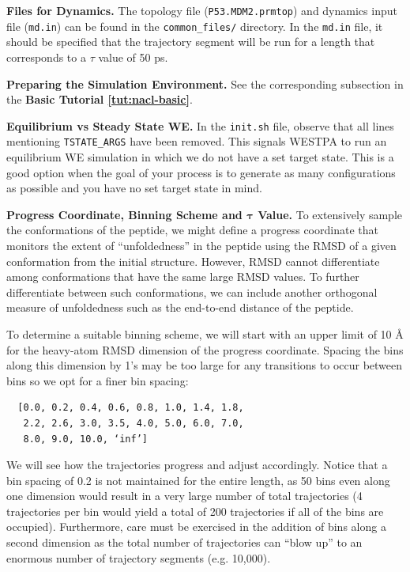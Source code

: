 \textbf{Files for Dynamics.} The topology file (\verb|P53.MDM2.prmtop|) and dynamics input file (\verb|md.in|) can be found in the \verb|common_files/| directory. 
In the \verb|md.in| file, it should be specified that the trajectory segment will be run for a length that corresponds to a $\tau$ value of 50 ps.

\textbf{Preparing the Simulation Environment.} See the corresponding subsection in the \textbf{Basic Tutorial \ref{tut:nacl-basic}}.

\textbf{Equilibrium vs Steady State WE.} In the \verb|init.sh| file, observe that all lines mentioning \verb|TSTATE_ARGS| have been removed. 
This signals WESTPA to run an equilibrium WE simulation in which we do not have a set target state. 
This is a good option when the goal of your process is to generate as many configurations as possible and you have no set target state in mind.

\textbf{Progress Coordinate, Binning Scheme and $\pmb{\tau}$ Value.} To extensively sample the conformations of the peptide, we might define a progress coordinate that monitors the extent of “unfoldedness” in the peptide using the RMSD of a given conformation from the initial structure. 
However, RMSD cannot differentiate among conformations that have the same large RMSD values. 
To further differentiate between such conformations, we can include another orthogonal measure of unfoldedness such as the end-to-end distance of the peptide. 

To determine a suitable binning scheme, we will start with an upper limit of 10 \AA{} for the heavy-atom RMSD dimension of the progress coordinate. 
Spacing the bins along this dimension by 1’s may be too large for any transitions to occur between bins so we opt for a finer bin spacing:
\begin{verbatim}
  [0.0, 0.2, 0.4, 0.6, 0.8, 1.0, 1.4, 1.8,
   2.2, 2.6, 3.0, 3.5, 4.0, 5.0, 6.0, 7.0,
   8.0, 9.0, 10.0, ‘inf’]
\end{verbatim}
We will see how the trajectories progress and adjust accordingly. 
Notice that a bin spacing of 0.2 is not maintained for the entire length, as 50 bins even along one dimension would result in a very large number of total trajectories (4 trajectories per bin would yield a total of 200 trajectories if all of the bins are occupied). 
Furthermore, care must be exercised in the addition of bins along a second dimension as the total number of trajectories can “blow up” to an enormous number of trajectory segments (e.g. 10,000).

